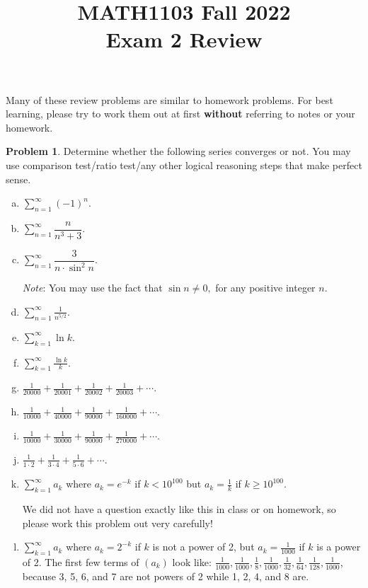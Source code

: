 \documentclass[11pt,oneside]{amsart}
\title{MATH1103 Fall 2022\\
Exam 2 Review}
\theoremstyle{definition}
\newtheorem{problem}{Problem}
\begin{document}
\maketitle

Many of these review problems are similar to homework problems. For best learning, please try to work them out at first \textbf{without} referring to notes or your homework.

\begin{problem}
Determine whether the following series converges or not. You may use comparison test/ratio test/any other logical reasoning steps that make perfect sense.
\begin{enumerate}[(a)]
  \item $\displaystyle\sum_{n=1}^\infty (-1)^n$.
  \item $\displaystyle\sum_{n=1}^\infty \dfrac{n}{n^3+3}$.
  \item $\displaystyle\sum_{n=1}^\infty \dfrac{3}{n\cdot {\sin}^2 n}$.

        \textit{Note}: You may use the fact that $\sin n \not =0,$ for any positive integer $n$.
  \item $\displaystyle\sum_{n=1}^\infty \frac{1}{n^{5/2}}$.
  \item $\displaystyle\sum_{k=1}^\infty \ln k$.
  \item $\displaystyle\sum_{k=1}^\infty\frac{\ln k}k$.
  \item $\displaystyle\frac 1{20000}+\frac 1{20001}+\frac 1{20002}+\frac 1{20003}+\cdots$.
  \item $\displaystyle\frac 1{10000}+\frac 1{40000}+\frac 1{90000}+\frac 1{160000}+\cdots$.
  \item $\displaystyle\frac 1{10000}+\frac 1{30000}+\frac 1{90000}+\frac 1{270000}+\cdots$.
  \item $\displaystyle \frac 1{1\cdot 2}+\frac 1{3\cdot 4}+\frac 1{5\cdot 6}+\cdots$.
  \item $\displaystyle\sum_{k=1}^\infty a_k$ where $a_k=e^{-k}$ if $k<10^{100}$ but $a_k=\frac 1k$ if $k\geq 10^{100}$.

        We did not have a question exactly like this in class or on homework, so please work this problem out very carefully!
  \item $\displaystyle\sum_{k=1}^\infty a_k$ where $a_k=2^{-k}$ if $k$ is not a power of 2, but $a_k=\frac 1{1000}$ if $k$ is a power of 2. The first few terms of $(a_k)$ look like: $\frac 1{1000}, \frac 1{1000}, \frac 18, \frac 1{1000}, \frac 1{32}, \frac 1{64}, \frac 1{128}, \frac 1{1000}$, because 3, 5, 6, and 7 are not powers of 2 while 1, 2, 4, and 8 are.
\end{enumerate}
\end{problem}
\end{document}
